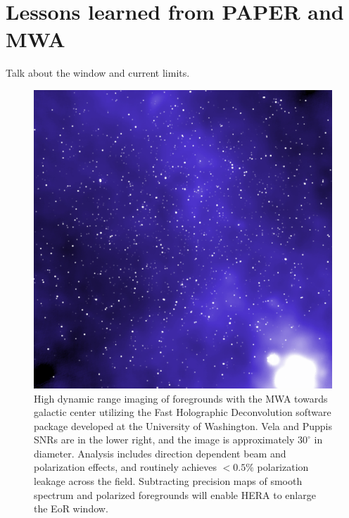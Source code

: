 \documentclass[preprint]{aastex}
\begin{document}
\section{Lessons learned from PAPER and MWA}
\label{LessonsSec}

Talk about the window and current limits.

\begin{figure}\centering
\includegraphics[width=6.5in]{plots/MWApretty.png}
\caption{\small
High dynamic range imaging of foregrounds with the MWA towards galactic center utilizing the Fast Holographic Deconvolution software package developed at the University of Washington. Vela and Puppis SNRs are in the lower right, and the image is approximately $30^{\circ}$ in diameter. Analysis includes direction dependent beam and polarization effects, and routinely achieves $<0.5\%$ polarization leakage across the field. Subtracting precision maps of smooth spectrum and polarized foregrounds will enable HERA to enlarge the EoR window.
}\label{fig:prettyPicture}
\end{figure}
\end{document}
